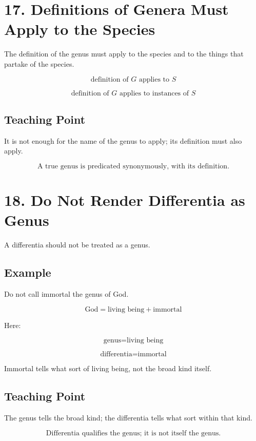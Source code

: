 \documentclass[12pt]{article}
\begin{document}
\section*{17. Definitions of Genera Must Apply to the Species}

The definition of the genus must apply to the species and to the things that
partake of the species.

\[
\text{definition of } G \text{ applies to } S
\]

\[
\text{definition of } G \text{ applies to instances of } S
\]

\subsection*{Teaching Point}

It is not enough for the name of the genus to apply; its definition must also
apply.

\[
\boxed{
\text{A true genus is predicated synonymously, with its definition.}
}
\]

\section*{18. Do Not Render Differentia as Genus}

A differentia should not be treated as a genus.

\subsection*{Example}

Do not call immortal the genus of God.

\[
\text{God} = \text{living being} + \text{immortal}
\]

Here:

\[
\text{genus} = \text{living being}
\]

\[
\text{differentia} = \text{immortal}
\]

Immortal tells what sort of living being, not the broad kind itself.

\subsection*{Teaching Point}

The genus tells the broad kind; the differentia tells what sort within that
kind.

\[
\boxed{
\text{Differentia qualifies the genus; it is not itself the genus.}
}
\]
\end{document}
